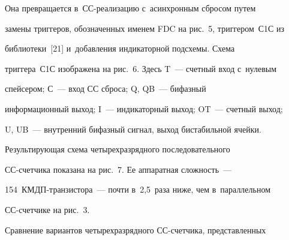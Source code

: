 \vspace*{-12pt}








  Она превращается в~СС-реализацию с~асинхронным сбросом путем 

замены триггеров, обозначенных именем FDC на рис.~5, триггером~С1С из  

биб\-лио\-те\-ки~[21] и~добавления индикаторной подсхемы. Схема 

триг\-ге\-ра~С1С изоб\-ра\-же\-на на рис.~6. Здесь T~--- счетный вход с~нулевым 

спейсером; С~--- вход СС сброса; Q, QB~--- бифазный 

информационный выход; I~--- индикаторный выход; OT~--- счетный выход; 

U, UB~--- внут\-рен\-ний бифазный сигнал, выход би\-ста\-биль\-ной ячейки. 

  





  Результирующая схема четырехразрядного последовательного  

СС-счет\-чи\-ка показана на рис.~7. Ее аппаратная слож\-ность~---  

154~КМДП-тран\-зис\-то\-ра~--- почти в~2,5~раза ниже, чем в~параллельном 

СС-счетчике на рис.~3.

  





  Сравнение вариантов четырехразрядного СС-счет\-чи\-ка, пред\-став\-лен\-ных 

